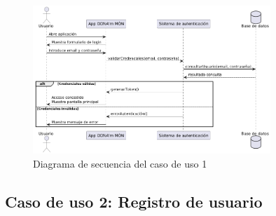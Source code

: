 \begin{figure}[H]
    \centering
    \includegraphics[width=0.8\textwidth]{figs/caso1.png}
    \caption{Diagrama de secuencia del caso de uso 1}
\end{figure}


\subsection{Caso de uso 2: Registro de usuario}

